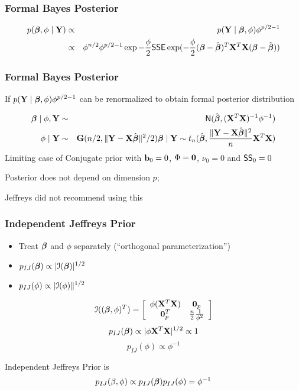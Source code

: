 \documentclass[handout]{beamer}
\begin{document}
\begin{frame}
  \frametitle{Formal Bayes Posterior}
  \begin{eqnarray*}
  p(\boldsymbol{\beta}, \phi \mid \mathbf{Y}) & \propto & p(\mathbf{Y} \mid \boldsymbol{\beta}, \phi)  \phi^{p/2 - 1} \\    
 & \propto & \phi^{n/2} \phi^{p/2 - 1} \exp{- \frac{\phi}{2} \textsf{SSE}}
\exp(- \frac{\phi}{2} (\boldsymbol{\beta} - \hat{\boldsymbol{\beta}})^T \mathbf{X}^T\mathbf{X} (\boldsymbol{\beta} - \hat{\boldsymbol{\beta}}))   \end{eqnarray*}

\vfill

\end{frame}
\begin{frame} \frametitle{Formal Bayes Posterior}
If $ p(\mathbf{Y} \mid \boldsymbol{\beta}, \phi)  \phi^{p/2 - 1}$ can be renormalized to obtain formal posterior distribution \pause  


\begin{eqnarray*}
  \boldsymbol{\beta} \mid \phi, \mathbf{Y} & \sim & \textsf{N}(\hat{\boldsymbol{\beta}}, (\mathbf{X}^T\mathbf{X})^{-1} \phi^{-1}) \\
  \phi \mid \mathbf{Y} & \sim& \mathbf{G}(n/2, \| \mathbf{Y} - \mathbf{X}\hat{\boldsymbol{\beta}} \|^2/2)
\boldsymbol{\beta} \mid \mathbf{Y} \sim t_{n}(\hat{\boldsymbol{\beta}}, \frac{\| \mathbf{Y} - \mathbf{X}\hat{\boldsymbol{\beta}} \|^2}{n} \mathbf{X}^T\mathbf{X})
\end{eqnarray*} \pause
Limiting case of Conjugate prior with $\mathbf{b}_0 = 0$, $\Phi = \mathbf{0}$,
$\nu_0 = 0$ and $\textsf{SS}_0 = 0$ \pause

Posterior does not depend on dimension $p$;   \pause

\vfill
Jeffreys did not recommend using this 
\end{frame}
\begin{frame}
  \frametitle{Independent Jeffreys Prior}
  \begin{itemize}
  \item  Treat $\boldsymbol{\beta}$ and $\phi$ separately  (``orthogonal
    parameterization'') \pause
  \item $p_{IJ}(\boldsymbol{\beta}) \propto |{\cal{I}}(\boldsymbol{\beta})|^{1/2}$ \pause
\item $p_{IJ}(\phi) \propto |{\cal{I}}(\phi)\|^{1/2}$ \pause
  \end{itemize}
$$
{\cal{I}}((\boldsymbol{\beta}, \phi)^T)  =  \left[
  \begin{array}{cc}
    \phi (\mathbf{X}^T\mathbf{X}) & \mathbf{0}_p \\
  \mathbf{0}_p^T & \frac{n}{2} \frac{1}{\phi^2} 
  \end{array}
\right]
$$
\pause
$$p_{IJ}(\boldsymbol{\beta}) \propto |\phi \mathbf{X}^T\mathbf{X}|^{1/2} \propto 1$$ \pause
$$p_{IJ}(\phi) \propto \phi^{-1}$$ \pause

Independent Jeffreys Prior is 
$$p_{IJ}(\beta, \phi) \propto p_{IJ}(\boldsymbol{\beta}) p_{IJ}(\phi) = \phi^{-1}$$
  
\end{frame}
\end{document}
